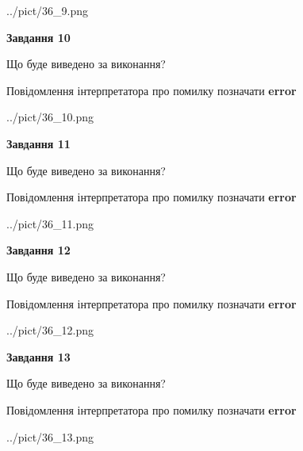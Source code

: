 \documentclass[11pt, ukrainian]{article}
\begin{document}
{\begin {large}
\begin{center}
	{../pict/36_9.png}
\end{center}
\newpage

{\begin {center}\textbf{Завдання 10}\end {center}}\par
Що буде виведено за виконання? \par
Повідомлення інтерпретатора про помилку позначати \textbf{error}

\begin{center}
	{../pict/36_10.png}
\end{center}
\newpage

{\begin {center}\textbf{Завдання 11}\end {center}}\par
Що буде виведено за виконання? \par
Повідомлення інтерпретатора про помилку позначати \textbf{error}

\begin{center}
	{../pict/36_11.png}
\end{center}
\newpage

{\begin {center}\textbf{Завдання 12}\end {center}}\par
Що буде виведено за виконання? \par
Повідомлення інтерпретатора про помилку позначати \textbf{error}

\begin{center}
	{../pict/36_12.png}
\end{center}
\newpage

{\begin {center}\textbf{Завдання 13}\end {center}}\par
Що буде виведено за виконання? \par
Повідомлення інтерпретатора про помилку позначати \textbf{error}

\begin{center}
	{../pict/36_13.png}
\end{center}
\newpage


\end{large}}
\end{document}
